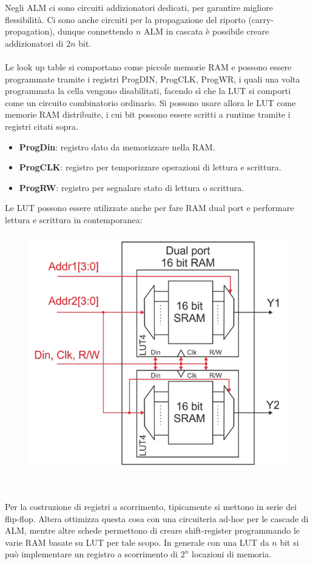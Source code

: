 \documentclass{book}
\begin{document}
    Negli ALM ci sono circuiti addizionatori dedicati, per garantire migliore flessibilità. Ci sono anche circuiti per la propagazione del riporto (carry-propagation), dunque connettendo $n$ ALM in cascata è possibile creare addizionatori di $2n$ bit. \\ \\
    Le look up table si comportano come piccole memorie RAM e possono essere programmate tramite i registri ProgDIN, ProgCLK, ProgWR, i quali una volta programmata la cella vengono disabilitati, facendo sì che la LUT si comporti come un circuito combinatorio ordinario. Si possono usare allora le LUT come memorie RAM distribuite, i cui bit possono essere scritti a runtime tramite i registri citati sopra.
    \begin{itemize}
        \item \textbf{ProgDin}: registro dato da memorizzare nella RAM.
        \item \textbf{ProgCLK}: registro per temporizzare operazioni di lettura e scrittura.
        \item \textbf{ProgRW}: registro per segnalare stato di lettura o scrittura.
    \end{itemize}
    \newpage
    Le LUT possono essere utilizzate anche per fare RAM dual port e performare lettura e scrittura in contemporanea:
    \begin{figure}[h!]
        \centering
        \includegraphics[width=0.75\linewidth]{img/chapt4img12.png}
    \end{figure}
    \\ \\ 
    Per la costruzione di registri a scorrimento, tipicamente si mettono in serie dei flip-flop. Altera ottimizza questa cosa con una circuiteria ad-hoc per le cascade di ALM, mentre altre schede permettono di creare shift-register programmando le varie RAM basate su LUT per tale scopo. In generale con una LUT da $n$ bit si può implementare un registro a scorrimento di $2^{n}$ locazioni di memoria.
\end{document}

